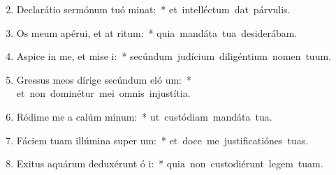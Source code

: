 \begin{flushleft}
\begin{enumerate}[leftmargin=*]
\setcounter{enumi}{1}

\item Declarátio sermónum tuó minat:~* \mbox{et intelléctum dat párvulis.}
\item Os meum apérui, et at ritum:~* \mbox{quia mandáta tua desiderábam.}
\item Aspice in me, et mise i:~* \mbox{secúndum judícium diligéntium nomen tuum.}
\item Gressus meos dírige secúndum eló um:~* \mbox{et non dominétur mei omnis injustítia.}
\item Rédime me a calúm minum:~* \mbox{ut custódiam mandáta tua.}
\item Fáciem tuam illúmina super  um:~* \mbox{et doce me justificatiónes tuas.}
\item Exitus aquárum deduxérunt ó i:~* \mbox{quia non custodiérunt legem tuam.}


\end{enumerate}
\end{flushleft}

